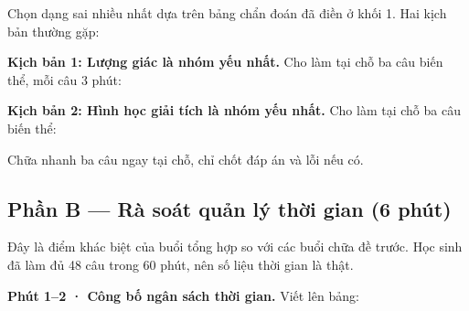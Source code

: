 \documentclass[11pt, a4paper]{article}
\begin{document}
Chọn dạng sai nhiều nhất dựa trên bảng chẩn đoán đã điền ở khối 1. Hai kịch bản thường gặp:

\textbf{Kịch bản 1: Lượng giác là nhóm yếu nhất.} Cho làm tại chỗ ba câu biến thể, mỗi câu 3 phút:


\textbf{Kịch bản 2: Hình học giải tích là nhóm yếu nhất.} Cho làm tại chỗ ba câu biến thể:


Chữa nhanh ba câu ngay tại chỗ, chỉ chốt đáp án và lỗi nếu có.

\subsection{Phần B — Rà soát quản lý thời gian (6 phút)}

Đây là điểm khác biệt của buổi tổng hợp so với các buổi chữa đề trước. Học sinh đã làm đủ 48 câu trong 60 phút, nên số liệu thời gian là thật.

\textbf{Phút 1–2 · Công bố ngân sách thời gian.} Viết lên bảng:
\end{document}
